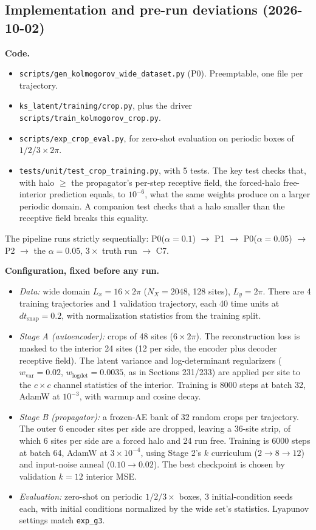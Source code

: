 \documentclass[11pt]{article}
\begin{document}
\subsection{Implementation and pre-run deviations (2026-10-02)}
\label{sec:crop_impl}

\textbf{Code.}
\begin{itemize}[leftmargin=*]
\item \texttt{scripts/gen\_kolmogorov\_wide\_dataset.py} (P0). Preemptable,
  one file per trajectory.
\item \texttt{ks\_latent/training/crop.py}, plus the driver
  \texttt{scripts/train\_kolmogorov\_crop.py}.
\item \texttt{scripts/exp\_crop\_eval.py}, for zero-shot evaluation on
  periodic boxes of $1/2/3\times2\pi$.
\item \texttt{tests/unit/test\_crop\_training.py}, with 5 tests. The key
  test checks that, with halo $\ge$ the propagator's per-step receptive
  field, the forced-halo free-interior prediction equals, to $10^{-6}$,
  what the same weights produce on a larger periodic domain. A companion
  test checks that a halo smaller than the receptive field breaks this
  equality.
\end{itemize}
The pipeline runs strictly sequentially:
P0($\alpha{=}0.1$) $\to$ P1 $\to$ P0($\alpha{=}0.05$) $\to$ P2 $\to$ the
$\alpha{=}0.05$, $3\times$ truth run $\to$ C7.

\textbf{Configuration, fixed before any run.}
\begin{itemize}[leftmargin=*]
\item \emph{Data:} wide domain $L_x{=}16\times2\pi$ ($N_X{=}2048$, 128
  sites), $L_y{=}2\pi$. There are 4 training trajectories and 1
  validation trajectory, each 40 time units at $dt_{\mathrm{snap}}{=}0.2$,
  with normalization statistics from the training split.
\item \emph{Stage A (autoencoder):} crops of 48 sites ($6\times2\pi$). The
  reconstruction loss is masked to the interior 24 sites (12 per side,
  the encoder plus decoder receptive field). The latent variance and
  log-determinant regularizers ($w_{\mathrm{var}}{=}0.02$,
  $w_{\mathrm{logdet}}{=}0.0035$, as in Sections 231/233) are applied per
  site to the $c{\times}c$ channel statistics of the interior. Training
  is 8000 steps at batch 32, AdamW at $10^{-3}$, with warmup and cosine
  decay.
\item \emph{Stage B (propagator):} a frozen-AE bank of 32 random crops per
  trajectory. The outer 6 encoder sites per side are dropped, leaving a
  36-site strip, of which 6 sites per side are a forced halo and 24 run
  free. Training is 6000 steps at batch 64, AdamW at
  $3\times10^{-4}$, using Stage 2's $k$ curriculum ($2\to8\to12$) and
  input-noise anneal ($0.10\to0.02$). The best checkpoint is chosen by
  validation $k{=}12$ interior MSE.
\item \emph{Evaluation:} zero-shot on periodic $1/2/3\times$ boxes, 3
  initial-condition seeds each, with initial conditions normalized by the
  wide set's statistics. Lyapunov settings match \texttt{exp\_g3}.
\end{itemize}
\end{document}
